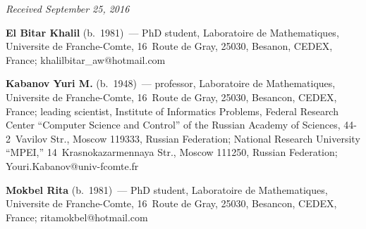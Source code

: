 \vspace*{-6pt}

\hfill{\small\textit{Received September 25, 2016}}

\vspace*{-18pt}

\Contr


\noindent
\textbf{El Bitar  Khalil} (b.\ 1981)~--- 
PhD student, Laboratoire de Mathematiques, Universite de Franche-Comte, 
16~Route de Gray, 25030, \mbox{Besan{\!}on}, CEDEX, France; 
\mbox{khalilbitar\_aw@hotmail.com}  

 \vspace*{1pt}
 
 \noindent
 \textbf{Kabanov Yuri M.} (b.\ 1948)~---
  professor, Laboratoire de Mathematiques, Universite de Franche-Comte, 
  16~Route de Gray, 25030, Besancon, CEDEX, France; leading scientist, 
  Institute of Informatics Problems, Federal Research Center 
  ``Computer Science and Control'' of the Russian Academy of Sciences,  
  44-2~Vavilov Str., Moscow 119333, Russian Federation; 
  National Research University ``MPEI,'' 14~Krasnokazarmennaya Str., 
  Moscow 111250, Russian Federation; \mbox{Youri.Kabanov@univ-fcomte.fr} 

\vspace*{1pt}
 
 \noindent
 \textbf{Mokbel Rita} (b.\ 1981)~--- 
 PhD student, Laboratoire de Mathematiques, Universite de Franche-Comte, 
 16~Route de Gray, 25030, Besancon, CEDEX, France; \mbox{ritamokbel@hotmail.com}








\newpage

\vspace*{-24pt}



\def\tit{О~ЕДИНСТВЕННОСТИ КЛИРИНГОВЫХ ВЕКТОРОВ, РЕДУЦИРУЮЩИХ 
СИСТЕМНЫЙ РИСК$^*$}

\def\aut{Х.~Эль Битар$^1$, Ю.~Кабанов$^{1,2,3}$, Р.~Мокбель$^1$}


\def\titkol{О~единственности клиринговых векторов, редуцирующих 
системный риск}

\def\autkol{Х.~Эль Битар, Ю.~Кабанов, Р.~Мокбель}

